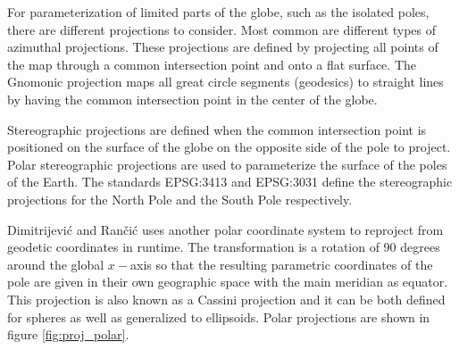 For parameterization of limited parts of the globe, such as the isolated poles, there are different projections to consider. Most common are different types of azimuthal projections. These projections are defined by projecting all points of the map through a common intersection point and onto a flat surface. The Gnomonic projection maps all great circle segments (geodesics) to straight lines by having the common intersection point in the center of the globe.

Stereographic projections are defined when the common intersection point is positioned on the surface of the globe on the opposite side of the pole to project. Polar stereographic projections are used to parameterize the surface of the poles of the Earth. The standards EPSG:3413 and EPSG:3031 define the stereographic projections for the North Pole and the South Pole respectively.

Dimitrijevi\'{c} and Ran\v{c}i\'{c} uses another polar coordinate system to reproject from geodetic coordinates in runtime. The transformation is a rotation of 90 degrees around the global $x-$axis so that the resulting parametric coordinates of the pole are given in their own geographic space with the main meridian as equator. This projection is also known as a Cassini projection and it can be both defined for spheres as well as generalized to ellipsoids. Polar projections are shown in figure \ref{fig:proj_polar}.

